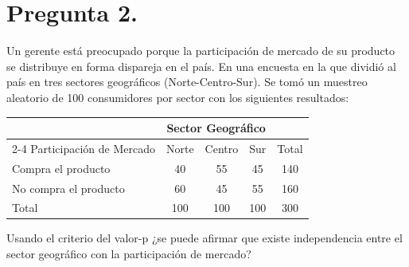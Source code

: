 \documentclass[12pt,a4paper]{article}
\begin{document}

\section*{Pregunta 2.}
Un gerente está preocupado porque la participación de mercado de su producto se distribuye en forma dispareja en el país. En una encuesta en la que dividió al país en tres sectores geográficos (Norte-Centro-Sur). Se tomó un muestreo aleatorio de 100 consumidores por sector con los siguientes resultados:

\begin{center}
    \begin{tabular}{lcccc}
        \toprule
        & \multicolumn{3}{c}{Sector Geográfico} & \\
        \cmidrule{2-4}
        Participación de Mercado & Norte & Centro & Sur & Total \\
        \midrule
        Compra el producto & 40 & 55 & 45 & 140 \\
        No compra el producto & 60 & 45 & 55 & 160 \\
        \midrule
        Total & 100 & 100 & 100 & 300 \\
        \bottomrule
    \end{tabular}
\end{center}

Usando el criterio del valor-p ¿se puede afirmar que existe independencia entre el sector geográfico con la participación de mercado?
\end{document}
